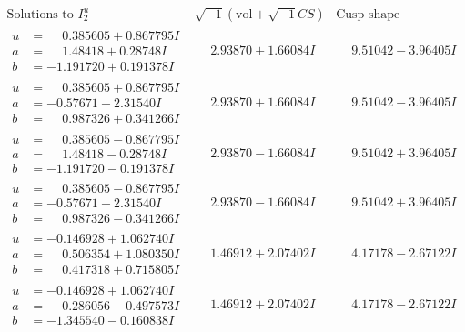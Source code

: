 \documentclass[1p]{elsarticle_modified}
\theoremstyle{definition}
\newcommand{\I}{\sqrt{-1}}
\begin{document}
$$\begin{array}{c|c|c}  
\text{Solutions to }I^u_{2}& \I (\text{vol} + \sqrt{-1}CS) & \text{Cusp shape}\\
 \hline 
\begin{aligned}
u &= \phantom{-}0.385605 + 0.867795 I \\
a &= \phantom{-}1.48418 + 0.28748 I \\
b &= -1.191720 + 0.191378 I\end{aligned}
 & \phantom{-}2.93870 + 1.66084 I & \phantom{-}9.51042 - 3.96405 I \\ \hline\begin{aligned}
u &= \phantom{-}0.385605 + 0.867795 I \\
a &= -0.57671 + 2.31540 I \\
b &= \phantom{-}0.987326 + 0.341266 I\end{aligned}
 & \phantom{-}2.93870 + 1.66084 I & \phantom{-}9.51042 - 3.96405 I \\ \hline\begin{aligned}
u &= \phantom{-}0.385605 - 0.867795 I \\
a &= \phantom{-}1.48418 - 0.28748 I \\
b &= -1.191720 - 0.191378 I\end{aligned}
 & \phantom{-}2.93870 - 1.66084 I & \phantom{-}9.51042 + 3.96405 I \\ \hline\begin{aligned}
u &= \phantom{-}0.385605 - 0.867795 I \\
a &= -0.57671 - 2.31540 I \\
b &= \phantom{-}0.987326 - 0.341266 I\end{aligned}
 & \phantom{-}2.93870 - 1.66084 I & \phantom{-}9.51042 + 3.96405 I \\ \hline\begin{aligned}
u &= -0.146928 + 1.062740 I \\
a &= \phantom{-}0.506354 + 1.080350 I \\
b &= \phantom{-}0.417318 + 0.715805 I\end{aligned}
 & \phantom{-}1.46912 + 2.07402 I & \phantom{-}4.17178 - 2.67122 I \\ \hline\begin{aligned}
u &= -0.146928 + 1.062740 I \\
a &= \phantom{-}0.286056 - 0.497573 I \\
b &= -1.345540 - 0.160838 I\end{aligned}
 & \phantom{-}1.46912 + 2.07402 I & \phantom{-}4.17178 - 2.67122 I \\ \hline\begin{aligned}

\end{aligned}
\end{array}$$
\end{document}
